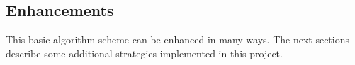 
\subsection{Enhancements}
This basic algorithm scheme can be enhanced in many ways. The next sections describe some additional strategies implemented in this project.

